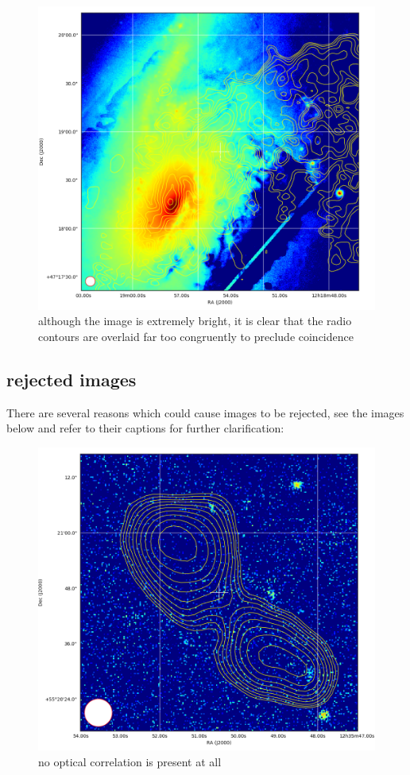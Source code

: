 \documentclass{article}
\begin{document}
\begin{figure}
    \centering
    \includegraphics[scale = 0.5]{nice3.png}
    \caption{although the image is extremely bright, it is clear that the radio contours are overlaid far too congruently to preclude coincidence}
\end{figure}

\subsection{rejected images}

There are several reasons which could cause images to be rejected, see the images below and refer to their captions for further clarification:

\begin{figure}
    \centering
    \includegraphics[scale = 0.5]{bad1.png}
    \caption{ no optical correlation is present at all}
\end{figure}
\end{document}
